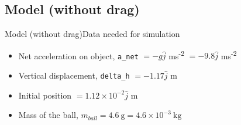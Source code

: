 




\subsection{Model (without drag)}
\begin{frame}{Model (without drag)}{Data needed for simulation}
\begin{itemize}
    \item Net acceleration on object, \texttt{a\_net} \( = -g\hat{j}\)
     ms\textsuperscript{-2} \( = -9.8\hat{j}\) ms\textsuperscript{-2}
    \item Vertical displacement, \texttt{delta\_h} \( = -1.17\hat{j}\) m
    \item Initial position \( = 1.12\times 10^{-2} \hat{j} \) m
    \item Mass of the ball, \(m_{ball} = 4.6\ \mathrm{g} = 4.6 \times 10^{-3}
    \ \mathrm{kg}\)
\end{itemize}
\end{frame}

